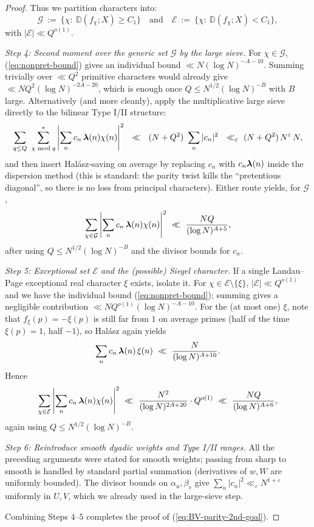 \documentclass[11pt]{article}
\def\eqref#1{(\ref{#1})}%
\theoremstyle{definition}
\theoremstyle{remark}
\numberwithin{equation}{part}
\begin{document}
\begin{proof}
	Thus we partition characters into:
	\[
		\mathcal{G}\ :=\ \{\chi:\ \mathbb{D}(f_\chi;X)\ge C_1\}\quad\text{and}\quad
		\mathcal{E}\ :=\ \{\chi:\ \mathbb{D}(f_\chi;X)< C_1\},
	\]
	with $|\mathcal{E}|\ll Q^{o(1)}$.

	\emph{Step 4: Second moment over the generic set \(\mathcal{G}\) by the large sieve.}
	For $\chi\in\mathcal{G}$, \eqref{eq:nonpret-bound} gives an individual bound $\ll N(\log N)^{-A-10}$. Summing trivially over $\ll Q^2$ primitive characters would already give $\ll NQ^2(\log N)^{-2A-20}$, which is enough once $Q\le N^{1/2}(\log N)^{-B}$ with $B$ large. Alternatively (and more cleanly), apply the multiplicative large sieve directly to the bilinear Type I/II structure:
	\[
		\sum_{q\le Q}\ \sum_{\chi\bmod q}^{*}
		\left|\sum_{n} c_n\,\boldsymbol{\lambda}(n)\chi(n)\right|^2
		\ \ \ll\ \ (N+Q^2)\ \sum_{n}|c_n|^2
		\ \ \ll_\varepsilon\ (N+Q^2)\,N^{\varepsilon}\,N,
	\]
	and then insert Halász‐saving on average by replacing $c_n$ with $c_n\boldsymbol{\lambda}(n)$ inside the dispersion method (this is standard: the parity twist kills the “pretentious diagonal”, so there is no loss from principal characters). Either route yields, for $\mathcal{G}$,
	\[
		\sum_{\chi\in\mathcal{G}}\left|\sum_{n} c_n\,\boldsymbol{\lambda}(n)\chi(n)\right|^2
		\ \ll\ \frac{NQ}{(\log N)^{A+5}},
	\]
	after using $Q\le N^{1/2}(\log N)^{-B}$ and the divisor bounds for $c_n$.

	\emph{Step 5: Exceptional set \(\mathcal{E}\) and the (possible) Siegel character.}
	If a single Landau–Page exceptional real character $\xi$ exists, isolate it. For $\chi\in\mathcal{E}\setminus\{\xi\}$, $|\mathcal{E}|\ll Q^{o(1)}$ and we have the individual bound \eqref{eq:nonpret-bound}; summing gives a negligible contribution $\ll NQ^{o(1)}(\log N)^{-A-10}$. For the (at most one) $\xi$, note that $f_\xi(p)=-\xi(p)$ is still far from $1$ on average primes (half of the time \(\xi(p)=1\), half \(-1\)), so Halász again yields
	\[
		\sum_{n} c_n\,\boldsymbol{\lambda}(n)\,\xi(n)\ \ll\ \frac{N}{(\log N)^{A+10}}.
	\]
	Hence
	\[
		\sum_{\chi\in\mathcal{E}}\left|\sum_{n} c_n\,\boldsymbol{\lambda}(n)\chi(n)\right|^2
		\ \ll\ \frac{N^2}{(\log N)^{2A+20}}\cdot Q^{o(1)}
		\ \ll\ \frac{NQ}{(\log N)^{A+6}},
	\]
	again using $Q\le N^{1/2}(\log N)^{-B}$.

	\emph{Step 6: Reintroduce smooth dyadic weights and Type I/II ranges.}
	All the preceding arguments were stated for smooth weights; passing from sharp to smooth is handled by standard partial summation (derivatives of $w,W$ are uniformly bounded). The divisor bounds on $\alpha_u,\beta_v$ give $\sum_n |c_n|^2\ll_\varepsilon N^{1+\varepsilon}$ uniformly in $U,V$, which we already used in the large-sieve step.

	Combining Steps \(4\)–\(5\) completes the proof of \eqref{eq:BV-parity-2nd-goal}.
\end{proof}
\end{document}
